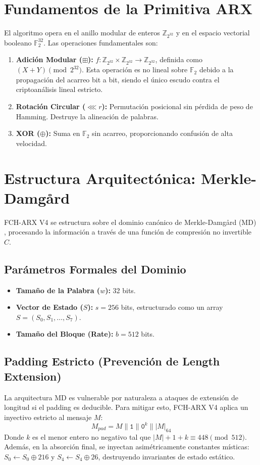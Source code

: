 \documentclass[10pt,twocolumn,letterpaper]{article}
\begin{document}
\section{Fundamentos de la Primitiva ARX}

El algoritmo opera en el anillo modular de enteros $\mathbb{Z}_{2^{32}}$ y en el espacio vectorial booleano $\mathbb{F}_2^{32}$. Las operaciones fundamentales son:

\begin{enumerate}
    \item \textbf{Adición Modular ($\boxplus$):} $f: \mathbb{Z}_{2^{32}} \times \mathbb{Z}_{2^{32}} \to \mathbb{Z}_{2^{32}}$, definida como $(X + Y) \pmod{2^{32}}$. Esta operación es no lineal sobre $\mathbb{F}_2$ debido a la propagación del acarreo bit a bit, siendo el único escudo contra el criptoanálisis lineal estricto.
    \item \textbf{Rotación Circular ($\lll r$):} Permutación posicional sin pérdida de peso de Hamming. Destruye la alineación de palabras.
    \item \textbf{XOR ($\oplus$):} Suma en $\mathbb{F}_2$ sin acarreo, proporcionando confusión de alta velocidad.
\end{enumerate}

\section{Estructura Arquitectónica: Merkle-Damgård}

FCH-ARX V4 se estructura sobre el dominio canónico de Merkle-Damgård (MD) \cite{merkle}, procesando la información a través de una función de compresión no invertible $C$.

\subsection{Parámetros Formales del Dominio}
\begin{itemize}
    \item \textbf{Tamaño de la Palabra ($w$):} 32 bits.
    \item \textbf{Vector de Estado ($S$):} $s = 256$ bits, estructurado como un array $S = (S_0, S_1, \dots, S_7)$.
    \item \textbf{Tamaño del Bloque (Rate):} $b = 512$ bits.
\end{itemize}

\subsection{Padding Estricto (Prevención de Length Extension)}
La arquitectura MD es vulnerable por naturaleza a ataques de extensión de longitud si el padding es deducible. Para mitigar esto, FCH-ARX V4 aplica un inyectivo estricto al mensaje $M$:
\begin{equation}
    M_{pad} = M \parallel \texttt{1} \parallel \texttt{0}^k \parallel |M|_{64}
\end{equation}
Donde $k$ es el menor entero no negativo tal que $|M| + 1 + k \equiv 448 \pmod{512}$. Además, en la absorción final, se inyectan asimétricamente constantes místicas: $S_0 \gets S_0 \oplus 216$ y $S_4 \gets S_4 \oplus 26$, destruyendo invariantes de estado estático.
\end{document}
